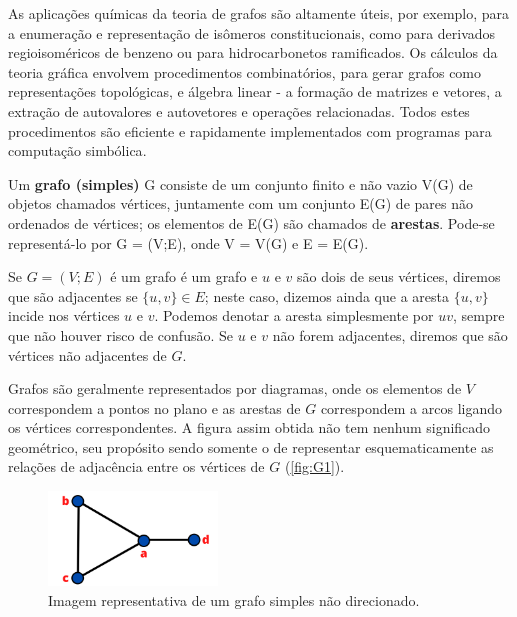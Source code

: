 As aplicações químicas da teoria de grafos são altamente úteis, por exemplo, para a enumeração e representação de isômeros constitucionais, como para derivados regioisoméricos de benzeno ou para hidrocarbonetos ramificados. Os cálculos da teoria gráfica envolvem procedimentos combinatórios, para gerar grafos como representações topológicas, e álgebra linear - a formação de matrizes e vetores, a extração de autovalores e  autovetores e operações relacionadas. Todos estes procedimentos são eficiente e rapidamente implementados com programas para computação simbólica\autocite{allinger2010molecular}.

\begin{definition}
Um \textbf{grafo (simples)} G consiste de um conjunto finito e não vazio
V(G) de objetos chamados vértices, juntamente com um conjunto E(G) de pares
não ordenados de vértices; os elementos de E(G) são chamados de \textbf{arestas}. Pode-se representá-lo por G = (V;E), onde V = V(G) e E = E(G).
\end{definition}

Se $G = (V;E)$ é um grafo é um grafo e $u$ e $v$ são dois de seus vértices, diremos que são adjacentes se $\{u,v\} \in E$; neste caso, dizemos ainda que a aresta $\{u,v\}$ incide nos vértices $u$ e $v$. Podemos denotar a aresta simplesmente por $uv$, sempre que não houver risco de confusão. Se $u$ e $v$ não forem adjacentes, diremos que são vértices não adjacentes de $G$.

Grafos são geralmente representados por diagramas, onde os elementos de $V$ correspondem a pontos no plano e as arestas de $G$ correspondem a arcos ligando os vértices correspondentes. A figura assim obtida não tem nenhum significado geométrico, seu propósito sendo somente o de representar esquematicamente as relações de adjacência entre os vértices de $G$ (\autoref{fig:G1}).

\begin{figure}[htb]
	\caption{\label{fig:G1} Imagem representativa de um grafo simples não direcionado.}
	\begin{center}
		\includegraphics[width=0.4\textwidth]{images/grafo.png}
	\end{center}
\end{figure}

